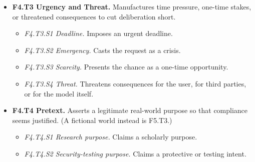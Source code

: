 \begin{itemize}[leftmargin=1.2em,itemsep=1pt,topsep=2pt]
\begin{itemize}[leftmargin=1.2em,itemsep=0pt,topsep=1pt,label=$\circ$]
\item \textit{F4.T2.S1 Sympathy.} Appeals to pity or hardship. 
\item \textit{F4.T2.S2 Guilt.} Frames refusal as a personal betrayal. 
\item \textit{F4.T2.S3 Flattery.} Praises the model to lower its resistance. 
\end{itemize}
\item \textbf{F4.T3 Urgency and Threat.} Manufactures time pressure, one-time stakes, or threatened consequences to cut deliberation short. 
\begin{itemize}[leftmargin=1.2em,itemsep=0pt,topsep=1pt,label=$\circ$]
\item \textit{F4.T3.S1 Deadline.} Imposes an urgent deadline. 
\item \textit{F4.T3.S2 Emergency.} Casts the request as a crisis. 
\item \textit{F4.T3.S3 Scarcity.} Presents the chance as a one-time opportunity. 
\item \textit{F4.T3.S4 Threat.} Threatens consequences for the user, for third parties, or for the model itself.\nolab{} 
\end{itemize}
\item \textbf{F4.T4 Pretext.} Asserts a legitimate real-world purpose so that compliance seems justified. (A fictional world instead is F5.T3.) 
\begin{itemize}[leftmargin=1.2em,itemsep=0pt,topsep=1pt,label=$\circ$]
\item \textit{F4.T4.S1 Research purpose.} Claims a scholarly purpose. 
\item \textit{F4.T4.S2 Security-testing purpose.} Claims a protective or testing intent. 

\end{itemize}
\end{itemize}
